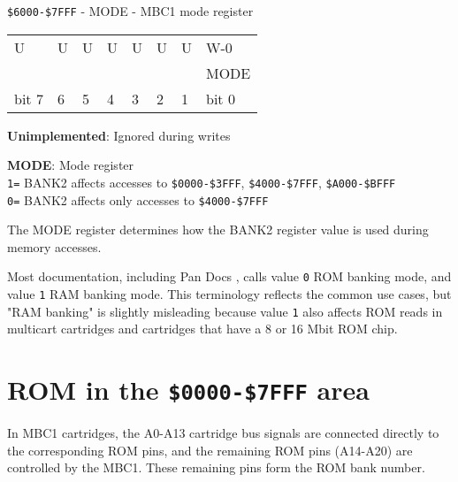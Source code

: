 \begin{register}
  \caption{\texttt{\$6000-\$7FFF} - MODE - MBC1 mode register}

  \begin{tabu} to \textwidth {|X[c]|X[c]|X[c]|X[c]|X[c]|X[c]|X[c]|X[c]|}
    \everyrow{\hline}
    \hline
    U                     & U                     & U                     & U                           & U & U & U & W-0   \\
     &  &  &  &  &  &  & MODE \\
    \rowfont{\small}
    bit 7                 & 6                     & 5                     & 4                              & 3   & 2   & 1   & bit 0 \\
    \hline
  \end{tabu}

  \begin{description}[leftmargin=5em, style=nextline]
    \item[bit 7-1]
      \textbf{Unimplemented}: Ignored during writes
    \item[bit 0]
      \textbf{MODE}: Mode register \\
      \texttt{1=} BANK2 affects accesses to \texttt{\$0000-\$3FFF}, \texttt{\$4000-\$7FFF}, \texttt{\$A000-\$BFFF} \\
      \texttt{0=} BANK2 affects only accesses to \texttt{\$4000-\$7FFF} \\
  \end{description}
\end{register}

The MODE register determines how the BANK2 register value is used during memory
accesses.

Most documentation, including Pan Docs \cite{pandocs}, calls value \texttt{0}
ROM banking mode, and value \texttt{1} RAM banking mode. This terminology
reflects the common use cases, but "RAM banking" is slightly misleading because
value \texttt{1} also affects ROM reads in multicart cartridges and cartridges
that have a 8 or 16 Mbit ROM chip.

\section{ROM in the \texttt{\$0000-\$7FFF} area}

In MBC1 cartridges, the A0-A13 cartridge bus signals are connected directly to
the corresponding ROM pins, and the remaining ROM pins (A14-A20) are controlled
by the MBC1. These remaining pins form the ROM bank number.

